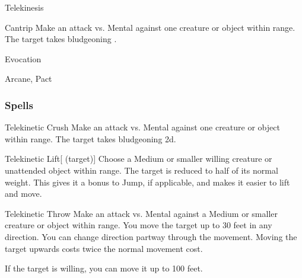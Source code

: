 \newpage
\begin{spellsection}{Telekinesis}

\begin{spellheader}
\end{spellheader}


\begin{ability}{Cantrip}
Make an attack vs. Mental against one creature or object within \rngmed range.
\hit The target takes bludgeoning .
\end{ability}




 Evocation

 Arcane, Pact
\end{spellsection}


\subsubsection{Spells}


\begin{ability}[\nth{1}]{Telekinetic Crush}
Make an attack vs. Mental against one creature or object within \rngmed range.
\hit The target takes bludgeoning  \plus2d.
\end{ability}
\vspace{0.25em}



\begin{ability}[\nth{1}]{Telekinetic Lift}[ (target)]
Choose a Medium or smaller willing creature or unattended object within \rngclose range.
The target is reduced to half of its normal weight.
This gives it a  bonus to Jump, if applicable, and makes it easier to lift and move.
\end{ability}
\vspace{0.25em}



\begin{ability}[\nth{1}]{Telekinetic Throw}
Make an attack vs. Mental against a Medium or smaller creature or object within \rngmed range.
\hit You move the target up to 30 feet in any direction.
You can change direction partway through the movement.
Moving the target upwards costs twice the normal movement cost.

If the target is willing, you can move it up to 100 feet.
\end{ability}
\vspace{0.25em}



